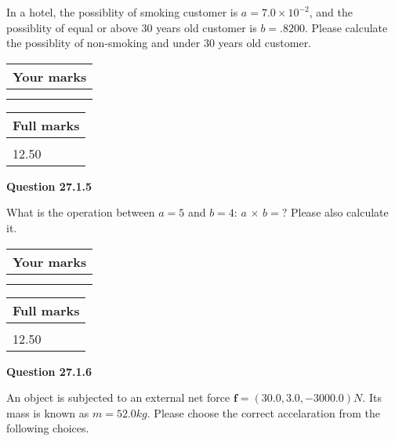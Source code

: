 \documentclass[12pt]{article}
\begin{document}
  
In a hotel, the possiblity of  %
smoking customer is
$a =  %
7.0 \times 10^{-2}$, and the possiblity of  %
equal or above 30 years old customer is $ b =  %
.8200$.
Please calculate the possiblity of  %
 non-smoking and  %
under 30 years old customer.
 

 

 
\vspace{0.3in}
  
\vspace{0.2in}
  
         \begin{tabular}{|l|}
\hline
 Your marks  \\
\hline
 \\ 
 \\ 
\hline
\end{tabular}
\hspace{0.05in} \begin{tabular}{|l|}
\hline
 Full marks  \\
\hline
 \\ 
12.50 \\
\hline
\end{tabular}
{\textbf{\Large{Question
27.1.5 
}}}
  
  
What is the operation between $a= %
5$ and $b= %
4$:
$a$  %
$\times$ $b=?$ Please also calculate it.

 
\vspace{0.3in}
  
\vspace{0.2in}
  
         \begin{tabular}{|l|}
\hline
 Your marks  \\
\hline
 \\ 
 \\ 
\hline
\end{tabular}
\hspace{0.05in} \begin{tabular}{|l|}
\hline
 Full marks  \\
\hline
 \\ 
12.50 \\
\hline
\end{tabular}
{\textbf{\Large{Question
27.1.6 
}}}
  
  
 
An object is subjected to an external net force $\mathbf{f}=(
30.0 ,
3.0,
-3000.0  )N$. Its mass is known as
$m= %
52.0  kg$. Please choose the correct accelaration
from the following choices.
 
\end{document}
